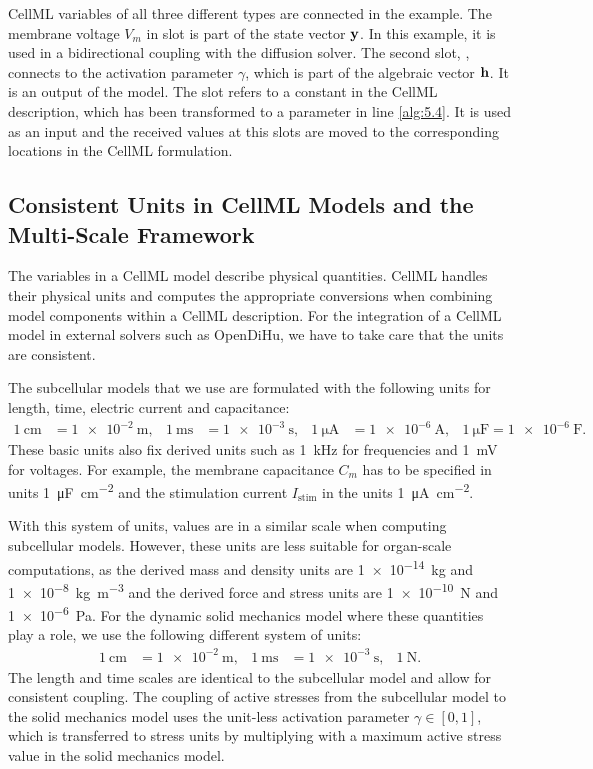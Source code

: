 CellML variables of all three different types are connected in the example. The membrane voltage $V_m$ in slot  is part of the state vector $\textbf{y}$. In this example, it is used in a bidirectional coupling with the diffusion solver. The second slot, , connects to the activation parameter $\gamma$, which is part of the algebraic vector $\textbf{h}$. It is an output of the model. The slot  refers to a constant in the CellML description, which has been transformed to a parameter in line \ref{alg:5.4}. It is used as an  input and the received values at this slots are moved to the corresponding locations in the CellML formulation.


\subsection{Consistent Units in CellML Models and the Multi-Scale Framework}

The variables in a CellML model describe physical quantities. CellML handles their physical units and computes the appropriate conversions when combining model components within a CellML description.
For the integration of a CellML model in external solvers such as OpenDiHu, we have to take care that the units are consistent.

The subcellular models that we use are formulated with the following units for length, time, electric current and capacitance:%
\begin{align*}
   \SI{1}{\centi\meter} &= \SI{1e-2}{\meter}, &
   \SI{1}{\milli\second} &= \SI{1e-3}{\second}, &
   \SI{1}{\micro\ampere} &= \SI{1e-6}{\ampere}, &
   \SI{1}{\micro\farad} = \SI{1e-6}{\farad}.
\end{align*}
These basic units also fix derived units such as \SI{1}{\kilo\hertz} for frequencies and \SI{1}{\milli\volt} for voltages. For example, the membrane capacitance $C_m$ has to be specified in units \SI{1}{\micro\farad\per\square\centi\meter} and the stimulation current $I_\text{stim}$ in the units \SI{1}{\micro\ampere\per\square\centi\meter}.

With this system of units, values are in a similar scale when computing subcellular models. However, these units are less suitable for organ-scale computations, as the derived mass and density units are \SI{1e-14}{\kilogram} and \SI{1e-8}{\kilogram\per\meter\cubed} and the derived force and stress units are \SI{1e-10}{\newton} and \SI{1e-6}{\pascal}. For the dynamic solid mechanics model where these quantities play a role, we use the following different system of units:
\begin{align*}
   \SI{1}{\centi\meter} &= \SI{1e-2}{\meter}, &
   \SI{1}{\milli\second} &= \SI{1e-3}{\second}, &
   \SI{1}{\newton}.
\end{align*}
The length and time scales are identical to the subcellular model and allow for consistent coupling. The coupling of active stresses from the subcellular model to the solid mechanics model uses the unit-less activation parameter $\gamma \in [0,1]$, which is transferred to stress units by multiplying with a maximum active stress value in the solid mechanics model.

